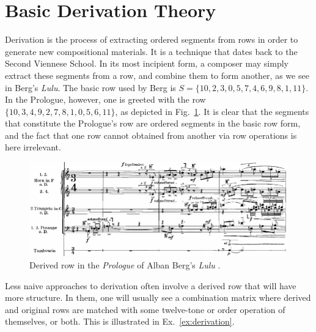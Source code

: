 \section{Basic Derivation Theory}

Derivation is the process of extracting ordered segments from rows in order to generate new compositional materials. It is a technique that dates back to the Second Viennese School. In its most incipient form, a composer may simply extract these segments from a row, and combine them to form another, as we see in Berg's \emph{Lulu}. The basic row used by Berg is $S = \{ 10, 2, 3, 0, 5, 7, 4, 6, 9, 8, 1, 11 \}$. In the Prologue, however, one is greeted with the row $\{ 10, 3, 4, 9, 2, 7, 8, 1, 0, 5, 6, 11 \}$, as depicted in Fig.~\ref{fig:berg-prologue}. It is clear that the segments that constitute the Prologue's row are ordered segments in the basic row form, and the fact that one row cannot obtained from another via row operations is here irrelevant.

\begin{figure}[htbp]
    \centering
	\includegraphics[width=6.5in]{figures/berg2.png}
	\caption[Derived Row in Berg's \emph{Lulu}]{Derived row in the \emph{Prologue} of Alban Berg's \emph{Lulu} \cite[182]{Starr1984}.}
	\label{fig:berg-prologue}
\end{figure}

Less naive approaches to derivation often involve a derived row that will have more structure. In them, one will usually see a combination matrix where derived and original rows are matched with some twelve-tone or order operation of themselves, or both. This is illustrated in Ex.~\ref{ex:derivation}.

